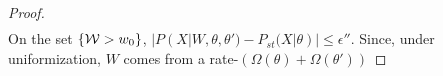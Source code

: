 \begin{proof}
\begin{align*}
\end{align*}
On the set $\{{\mathcal W} > w_0\}$, $|P(X |W, \theta, \theta')-P_{st}(X|\theta)|
\le \epsilon''$. Since, under uniformization, $W$ comes from a rate-$(\Omega(\theta) + \Omega(\theta'))$

\end{proof}
